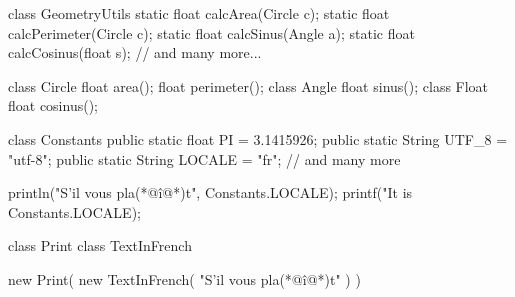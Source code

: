 \documentclass{article}
\begin{document}
\begin{lnSnippet}
class GeometryUtils {
  static float calcArea(Circle c);
  static float calcPerimeter(Circle c);
  static float calcSinus(Angle a);
  static float calcCosinus(float s);
  // and many more...
}
\end{lnSnippet}
\begin{lnSnippet}
class Circle {
  float area();
  float perimeter();
}
class Angle {
  float sinus();
}
class Float {
  float cosinus();
}
\end{lnSnippet}


\begin{lnSnippet}
class Constants {
  public static float PI = 3.1415926;
  public static String UTF_8 = "utf-8";
  public static String LOCALE = "fr";
  // and many more
}

println("S'il vous pla(*@\^{i}@*)t",
  Constants.LOCALE);
printf("It is %
  Constants.LOCALE);
\end{lnSnippet}
\begin{lnSnippet}
class Print { }
class TextInFrench { }

new Print(
  new TextInFrench(
    "S'il vous pla(*@\^{i}@*)t"
  )
)
\end{lnSnippet}
\end{document}
